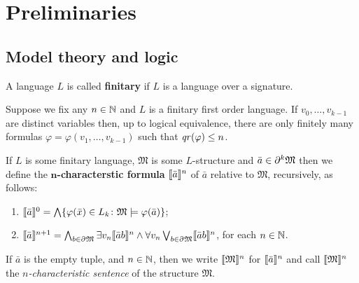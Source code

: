 \chapter{Preliminaries}

\section{Model theory and logic}

\begin{dfn}
	A language $L$ is called \textbf{finitary} if $L$ is a language over a  signature.
\end{dfn}

\begin{prp}\label{prp:finequiv}
	Suppose we fix any $n\in\mathbb{N}$ and $L$ is a finitary first order language. If $v_0,\dotsc,v_{k-1}$ are distinct variables then, up to logical equivalence, there are only finitely many formulas $\varphi=\varphi(v_1,\dotsc,v_{k-1})$ such that $\mathit{qr}(\varphi)\leq n$.
\end{prp}

\begin{dfn}
	If $L$ is some finitary language, $\mathfrak{M}$ is some $L$-structure and $\bar{a}\in\partial^{k}{\mathfrak{M}}$ then we define the \textbf{$\mathbf{n}$-characterstic formula} $\llbracket\bar{a}\rrbracket^{n}$ of $\bar{a}$ relative to $\mathfrak{M}$, recursively, as follows:
	\begin{enumerate}
		\item $\llbracket\bar{a}\rrbracket^{0}=\bigwedge\lbrace \varphi(\bar{x})\in L_k\colon \mathfrak{M}\models\varphi(\bar{a}) \rbrace$;
		\item $\llbracket\bar{a}\rrbracket^{n+1}=\bigwedge_{b\in\partial^{}\mathfrak{M}}\exists v_n \llbracket\bar{a}b\rrbracket^{n}\wedge\forall v_n\bigvee_{b\in\partial^{}\mathfrak{M}}\llbracket\bar{a}b\rrbracket^{n}$, for each $n\in\mathbb{N}$.
	\end{enumerate}
	If $\bar{a}$ is the empty tuple, and $n\in\mathbb{N}$, then we write $\llbracket\mathfrak{M}\rrbracket^{n}$ for $\llbracket\bar{a}\rrbracket^{n}$ and call $\llbracket\mathfrak{M}\rrbracket^{n}$ the \textit{$\mathit{n}$-characteristic sentence} of the structure $\mathfrak{M}$.
\end{dfn}

